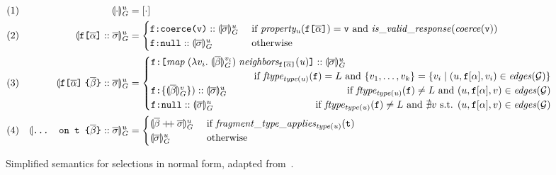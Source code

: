 \begin{figure*}[t]
    \centering \small
    \begin{align*}
    & (1) & \seval{\cdot}{u} &= [\cdot] \\
    & (2) & \sevalu{\fld :: \sset} &= 
    \begin{cases}
      \resp{\texttt{coerce(\val)}} :: \sevalu{\sset}  
        & \text{ if } \mathit{property_{u}(\fld)} = \val \text{ and } \mathit{is\_valid\_response (coerce (\val))} \\
      \resp{\nval} :: \sevalu{\sset} 
      & \text{ otherwise}
    \end{cases}\\
    & (3) & %
    \sevalu{\nfld{\overline{\beta}} :: \sset} &=
    \begin{cases}
      \resp{\texttt{[} \mathit{map}\; (\lambda v_{i}.\; \seval{\overline{\beta}}{v_{i}})\; 
      \mathit{neighbors_{\fld}(u)} \texttt{]}} :: \sevalu{\sset}  \\
     \hfill \text{ if } 
            \mathit{ftype_{type(u)}(\fkey)} = L \text{ and } \{v_{1}, \ldots, v_{k}\} = 
        \{v_{i} \mid (u, \fkey[\alpha], v_{i}) \in \mathit{edges}(\graph)\} \\
      \resp{\{\seval{\subqueries{\beta}}{v}\})} :: \sevalu{\sset}  
      \hfill \text{ if } 
        \mathit{ftype_{type(u)}(\fkey)}  \neq L \text{ and } (u, \fkey[\alpha], v) \in \mathit{edges}(\graph) \\
      \resp{\nval} :: \sevalu{\sset} 
     \qquad \qquad \qquad \qquad \qquad
    \text{ if } \mathit{ftype_{type(u)}(\fkey)}  \neq L  \text{ and } \nexists v \text{ s.t. }  (u, \fkey[\alpha], v) \in \mathit{edges}(\graph) \\
    \end{cases}\\
    & (4) & \sevalu{\ifrag{t}{\overline{\beta}}:: \sset} &= \begin{cases}
    \sevalu{\overline{\beta} \mdoubleplus \sset} & 
  	\text{ if }\mathit{fragment\_type\_applies_{type(u)}(\texttt{t})}\\
    \sevalu{\sset} & \text{ otherwise}
    \end{cases}
    \end{align*}
    \caption{Simplified semantics for selections in normal form, adapted from~\cite{gqlph}.} 
    \label{fig:simpl_semantics}
\end{figure*}

